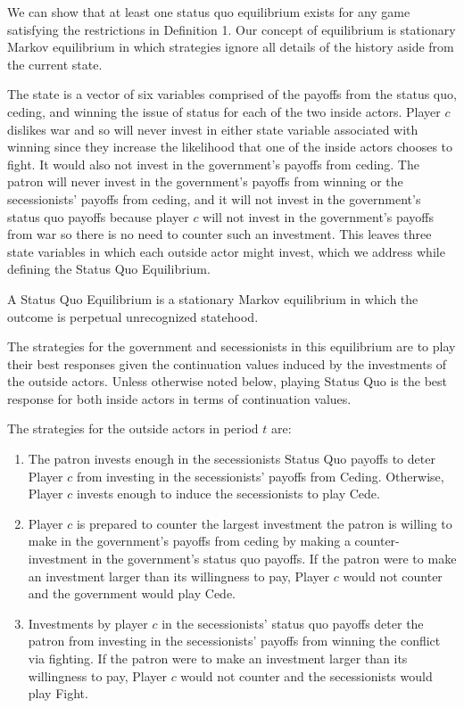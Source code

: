 We can show that at least one status quo equilibrium exists for any game satisfying the restrictions in Definition 1. Our concept of equilibrium is stationary Markov equilibrium in which strategies ignore all details of the history aside from the current state.

The state is a vector of six variables comprised of the payoffs from the status quo, ceding, and winning the issue of status for each of the two inside actors. Player $c$ dislikes war and so will never invest in either state variable associated with winning since they increase the likelihood that one of the inside actors chooses to fight. It would also not invest in the government's payoffs from ceding. The patron will never invest in the government's payoffs from winning or the secessionists' payoffs from ceding, and it will not invest in the government's status quo payoffs because player $c$ will not invest in the government's payoffs from war so there is no need to counter such an investment. This leaves three state variables in which each outside actor might invest, which we address while defining the Status Quo Equilibrium. 

\begin{definition}
A Status Quo Equilibrium is a stationary Markov equilibrium in which the outcome is perpetual unrecognized statehood.

The strategies for the government and secessionists in this equilibrium are to play their best responses given the continuation values induced by the investments of the outside actors. Unless otherwise noted below, playing Status Quo is the best response for both inside actors in terms of continuation values.

The strategies for the outside actors in period $t$ are:

\begin{enumerate}
	\item The patron invests enough in the secessionists Status Quo payoffs to deter Player $c$ from investing in the secessionists' payoffs from Ceding. Otherwise, Player $c$ invests enough to induce the secessionists to play Cede.

	\item Player $c$ is prepared to counter the largest investment the patron is willing to make in the government's payoffs from ceding by making a counter-investment in the government's status quo payoffs. If the patron were to make an investment larger than its willingness to pay, Player $c$ would not counter and the government would play Cede.
	
	\item Investments by player $c$ in the secessionists' status quo payoffs deter the patron from investing in the secessionists' payoffs from winning the conflict via fighting. If the patron were to make an investment larger than its willingness to pay, Player $c$ would not counter and the secessionists would play Fight.
\end{enumerate}
\end{definition}

